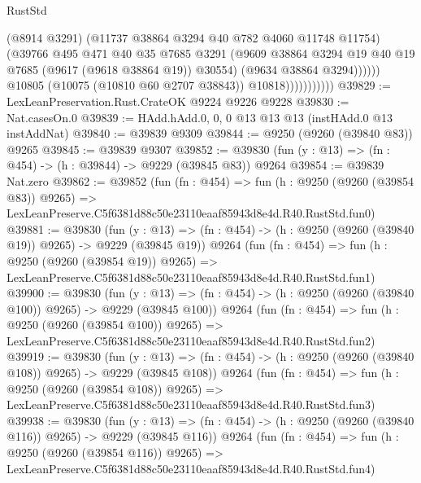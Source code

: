 \begin{lexlean}{RustStd}
\begin{coremodule}
                                  (@8914 @3291)
                                  (@11737 @38864 @3294 @40 @782 @4060 @11748 @11754)
                                  (@39766
                                    @495
                                    @471
                                    @40
                                    @35
                                    @7685
                                    @3291
                                    (@9609
                                      @38864
                                      @3294
                                      @19
                                      @40
                                      @19
                                      @7685
                                      (@9617 (@9618 @38864 @19))
                                      @30554)
                                    (@9634 @38864 @3294))))))
                          @10805
                          (@10075 (@10810 @60 @2707 @38843))
                          @10818)))))))))))
@39829 := LexLeanPreservation.Rust.CrateOK @9224 @9226 @9228
@39830 := Nat.casesOn.{0}
@39839 := HAdd.hAdd.{0, 0, 0} @13 @13 @13 (instHAdd.{0} @13 instAddNat)
@39840 := @39839 @9309
@39844 := @9250 (@9260 (@39840 @83)) @9265
@39845 := @39839 @9307
@39852 := @39830 (fun (y : @13) => (fn : @454) -> (h : @39844) -> @9229 (@39845 @83)) @9264
@39854 := @39839 Nat.zero
@39862 := @39852
    (fun (fn : @454) =>
    fun (h : @9250 (@9260 (@39854 @83)) @9265) =>
    LexLeanPreserve.C5f6381d88c50e23110eaaf85943d8e4d.R40.RustStd.fun0)
@39881 := @39830
    (fun (y : @13) => (fn : @454) -> (h : @9250 (@9260 (@39840 @19)) @9265) -> @9229 (@39845 @19))
    @9264
    (fun (fn : @454) =>
    fun (h : @9250 (@9260 (@39854 @19)) @9265) =>
    LexLeanPreserve.C5f6381d88c50e23110eaaf85943d8e4d.R40.RustStd.fun1)
@39900 := @39830
    (fun (y : @13) => (fn : @454) -> (h : @9250 (@9260 (@39840 @100)) @9265) -> @9229 (@39845 @100))
    @9264
    (fun (fn : @454) =>
    fun (h : @9250 (@9260 (@39854 @100)) @9265) =>
    LexLeanPreserve.C5f6381d88c50e23110eaaf85943d8e4d.R40.RustStd.fun2)
@39919 := @39830
    (fun (y : @13) => (fn : @454) -> (h : @9250 (@9260 (@39840 @108)) @9265) -> @9229 (@39845 @108))
    @9264
    (fun (fn : @454) =>
    fun (h : @9250 (@9260 (@39854 @108)) @9265) =>
    LexLeanPreserve.C5f6381d88c50e23110eaaf85943d8e4d.R40.RustStd.fun3)
@39938 := @39830
    (fun (y : @13) => (fn : @454) -> (h : @9250 (@9260 (@39840 @116)) @9265) -> @9229 (@39845 @116))
    @9264
    (fun (fn : @454) =>
    fun (h : @9250 (@9260 (@39854 @116)) @9265) =>
    LexLeanPreserve.C5f6381d88c50e23110eaaf85943d8e4d.R40.RustStd.fun4)

\end{coremodule}
\end{lexlean}
